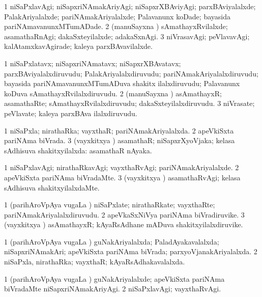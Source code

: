 \bentry
{}
\gl{\kirxvi}
\bmng
\bnum
\num{1} niSaPxlavAgi; niSapxriNAmakAriyAgi; niSapxrXBAviyAgi; parxBAviyalalxde; PalakAriyalalxde; pariNAmakAriyalalxde; Palavanunx koDade; bayasida pariNAmavanunxMTumADade. 
\num{2} (manuSayxna \vi) sAmathayxRvilalxde; asamathaRnAgi; dakaSxteyilalxde; adakaSxnAgi. 
\num{3} niVrasavAgi; peVlavavAgi; kalAtamxkavAgirade; kaleya parxBAvavilalxde. 
\enum
\emng
\eentry

\bentry
{}
\gl{\nA}
\bmng
\bnum
\num{1} niSaPxlatavx; niSapxriNAmatavx; niSapxrXBAvatavx; parxBAviyalalxdiruvudu; PalakAriyalalxdiruvudu; pariNAmakAriyalalxdiruvudu; bayasida pariNAmavanunxMTumADuva shakitx ilalxdiruvudu; Palavanunx koDuva sAmathayxRvilalxdiruvudu. 
\num{2} (manuSayxna \vi) asAmathayxR; asamathaRte; sAmathayxRvilalxdiruvudu; dakaSxteyilalxdiruvudu. 
\num{3} niVrasate; peVlavate; kaleya parxBAva ilalxdiruvudu. 
\enum
\emng
\eentry

\bentry
{}
\gl{\gu}
\bmng
\bnum
\num{1} niSaPxla; nirathaRka; vayxthaR; pariNAmakAriyalalxda. 
\num{2} apeVkiSxta pariNAma biVrada. 
\num{3} (vayxkitxya \vi) asamathaR; niSapxrXyoVjaka; kelasa sAdhisuva shakitxyilalxda:  asamathaR nAyaka. 
\enum
\emng
\eentry

\bentry
{}
\gl{\kirxvi}
\bmng
\bnum
\num{1} niSaPxlavAgi; nirathaRkavAgi; vayxthaRvAgi; pariNAmakAriyalalxde. 
\num{2} apeVkiSxta pariNAma biVradaMte. 
\num{3} (vayxkitxya \vi) asamathaRvAgi; kelasa sAdhisuva shakitxyilalxdaMte. 
\enum
\emng
\eentry

\bentry
{}
\gl{\nA}
\bmng
\bnum
\num{1} (parihAroVpAya \mo vugaLa \vi) niSaPxlate; nirathaRkate; vayxthaRte; pariNAmakAriyalalxdiruvudu. 
\num{2} apeVkaSxNiVya pariNAma biVradiruvike. 
\num{3} (vayxkitxya \vi) asAmathayxR; kAyaRsAdhane mADuva shakitxyilalxdiruvike. 
\enum
\emng
\eentry

\bentry
{}
\gl{\gu}
\bmng
\bnum
\num{1} (parihAroVpAya \mo vugaLa \vi) guNakAriyalalxda; PaladAyakavalalxda; niSapxriNAmakAri; apeVkiSxta pariNAma biVrada; parxyoVjanakAriyalalxda. 
\num{2} niSaPxla, nirathaRka; vayxthaR; kAyaRsAdhakavalalxda. 
\enum
\emng
\eentry

\bentry
{}
\gl{\kirxvi}
\bmng
\bnum
\num{1} (parihAroVpAya \mo vugaLa \vi) guNakAriyalalxde; apeVkiSxta pariNAma biVradaMte niSapxriNAmakAriyAgi. 
\num{2} niSaPxlavAgi; vayxthaRvAgi. 
\enum
\emng
\eentry


